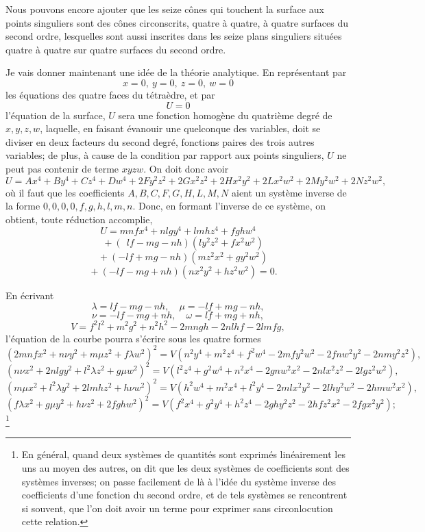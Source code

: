 \documentclass[12pt,a4paper]{article}
\begin{document}
Nous pouvons encore ajouter que les seize c\^ones qui touchent la surface aux points singuliers sont des c\^ones circonscrits, quatre \`a quatre, \`a quatre surfaces du second ordre, lesquelles sont aussi inscrites dans les seize plans singuliers situ\'ees quatre \`a quatre sur quatre surfaces du second ordre.

Je vais donner maintenant une id\'ee de la th\'eorie analytique. En repr\'esentant par
\[
x = 0,\ y = 0,\ z = 0,\ w = 0
\]
les \'equations des quatre faces du t\'etra\`edre, et par
\[
U = 0
\]
l'\'equation de la surface, $U$ sera une fonction homog\`ene du quatri\`eme degr\'e de $x, y, z, w$, laquelle, en faisant \'evanouir une quelconque des variables, doit se diviser en deux facteurs du second degr\'e, fonctions paires des trois autres variables; de plus, \`a cause de la condition par rapport aux points singuliers, $U$ ne peut pas contenir de terme $xyzw$. On doit donc avoir
\[
U = Ax^4 + By^4 + Cz^4 + Dw^4 + 2Fy^2 z^2 + 2Gx^2 z^2 + 2Hx^2 y^2 + 2Lx^2 w^2 + 2My^2 w^2 + 2Nz^2 w^2,
\]
o\`u il faut que les coefficients $A, B, C, F, G, H, L, M, N$ aient un syst\`eme inverse de la forme $0, 0, 0, 0, f, g, h, l, m, n$. Donc, en formant l'inverse de ce syst\`eme, on obtient, toute r\'eduction accomplie,
\[
U = mnfx^4 + nlgy^4 + lmhz^4 + fghw^4
\]
\[
\quad + (\ \ lf - mg - nh)(ly^2 z^2 + fx^2 w^2)
\]
\[
\quad + (-lf + mg - nh)(mz^2 x^2 + gy^2 w^2)
\]
\[
\quad + (-lf - mg + nh)(nx^2 y^2 + hz^2 w^2) = 0.
\]

En \'ecrivant
\[
\lambda = lf - mg - nh,\quad \mu = -lf + mg - nh,
\]
\[
\nu = -lf - mg + nh,\quad \omega = lf + mg + nh,
\]
\[
V = f^2 l^2 + m^2 g^2 + n^2 h^2 - 2mngh - 2nlhf - 2lmfg,
\]
l'\'equation de la courbe pourra s'\'ecrire sous les quatre formes
\[
(2mnfx^2 + n\nu y^2 + m\mu z^2 + f\lambda w^2)^2 = V(n^2 y^4 + m^2 z^4 + f^2 w^4 - 2mfy^2 w^2 - 2fn w^2 y^2 - 2nmy^2 z^2),
\]
\[
(n\nu x^2 + 2nlgy^2 + l^2\lambda z^2 + g\mu w^2)^2 = V(l^2 z^4 + g^2 w^4 + n^2 x^4 - 2gn w^2 x^2 - 2nl x^2 z^2 - 2lg z^2 w^2),
\]
\[
(m\mu x^2 + l^2\lambda y^2 + 2lmhz^2 + h\nu w^2)^2 = V(h^2 w^4 + m^2 x^4 + l^2 y^4 - 2ml x^2 y^2 - 2lh y^2 w^2 - 2hm w^2 x^2),
\]
\[
(f\lambda x^2 + g\mu y^2 + h\nu z^2 + 2fghw^2)^2 = V(f^2 x^4 + g^2 y^4 + h^2 z^4 - 2gh y^2 z^2 - 2hf z^2 x^2 - 2fg x^2 y^2);
\]
\footnote{En g\'en\'eral, quand deux syst\`emes de quantit\'es sont exprim\'es lin\'eairement les uns au moyen des autres, on dit que les deux syst\`emes de coefficients sont des syst\`emes inverses; on passe facilement de l\`a \`a l'id\'ee du syst\`eme inverse des coefficients d'une fonction du second ordre, et de tels syst\`emes se rencontrent si souvent, que l'on doit avoir un terme pour exprimer sans circonlocution cette relation.}
\end{document}
